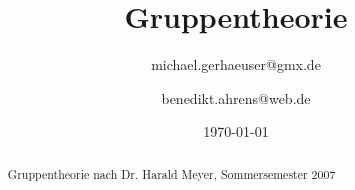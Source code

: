 \documentclass[12pt, a4paper,titlepage]{article}
\date{\today}
\author{michael.gerhaeuser@gmx.de \and benedikt.ahrens@web.de}
\title{Gruppentheorie}
\theoremstyle{mydefinition}
\theoremstyle{myplain}
\theoremstyle{myremark}
\theoremstyle{mybeweis}
\begin{document}
\maketitle

\begin{abstract}
\begin{center}
 Gruppentheorie nach Dr. Harald Meyer, Sommersemester 2007
\end{center}


\end{abstract}

\tableofcontents
\newpage











		

\printindex
\end{document}
